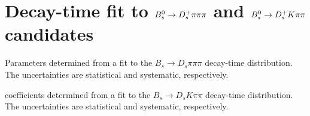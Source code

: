 \section{Decay-time fit to ${{B}^0_{s}}\rightarrow{\ensuremath{{D}^+_{s}}}{\ensuremath{\pi}}{\ensuremath{\pi}}{\ensuremath{\pi}}$ and ${{B}^0_{s}}\rightarrow{\ensuremath{{D}^+_{s}}}{\ensuremath{K}}{\ensuremath{\pi}}{\ensuremath{\pi}}$ candidates}
\label{sec:timeFit}


\begin{table}[h]
\centering
\footnotesize
\caption{\small Parameters determined from a fit to the $B_s \to D_s \pi \pi\pi$ decay-time distribution. The uncertainties are statistical and systematic, respectively.}
        \renewcommand{\arraystretch}{1.25}
        
\label{tab:normFitResults}
\end{table}


\begin{table}[h]
\centering
\caption{\CP coefficients determined from a fit to the $B_s \to D_s K \pi\pi$ decay-time distribution. The uncertainties are statistical and systematic, respectively.}
        \renewcommand{\arraystretch}{1.5}
        
\label{tab:sigFitResults}
\end{table}

